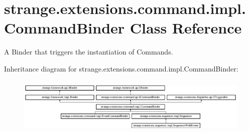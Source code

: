 \hypertarget{classstrange_1_1extensions_1_1command_1_1impl_1_1_command_binder}{\section{strange.\-extensions.\-command.\-impl.\-Command\-Binder Class Reference}
\label{classstrange_1_1extensions_1_1command_1_1impl_1_1_command_binder}
}


A Binder that triggers the instantiation of Commands.  


Inheritance diagram for strange.\-extensions.\-command.\-impl.\-Command\-Binder\-:\begin{figure}[H]
\begin{center}
\leavevmode
\includegraphics[height=2.737048cm]{classstrange_1_1extensions_1_1command_1_1impl_1_1_command_binder}
\end{center}
\end{figure}
